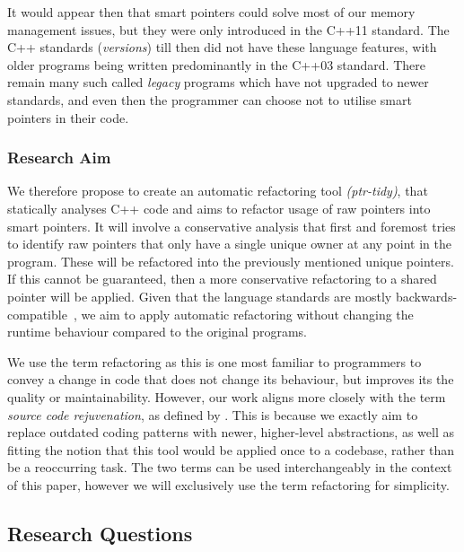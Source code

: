 \documentclass{proposal}
\begin{document}
    It would appear then that smart pointers could solve most of our memory management issues, but they were only introduced in the C++11 standard.
    The C++ standards (\textit{versions}) till then did not have these language features, with older programs being written predominantly in the C++03 standard.
    There remain many such called \emph{legacy} programs which have not upgraded to newer standards, and even then the programmer can choose not to utilise smart pointers in their code.

    \subsubsection{Research Aim}\label{subsubsec:reseach-aim}


    We therefore propose to create an automatic refactoring tool \emph{(ptr-tidy)}, that statically analyses C++ code and aims to refactor usage of raw pointers into smart pointers.
    It will involve a conservative analysis that first and foremost tries to identify raw pointers that only have a single unique owner at any point in the program.
    These will be refactored into the previously mentioned unique pointers.
    If this cannot be guaranteed, then a more conservative refactoring to a shared pointer will be applied.
    Given that the language standards are mostly backwards-compatible~\cite{Winters2020}, we aim to apply automatic refactoring without changing the runtime behaviour compared to the original programs.

    We use the term refactoring as this is one most familiar to programmers to convey a change in code that does not change its behaviour, but improves its the quality or maintainability.
    However, our work aligns more closely with the term \emph{source code rejuvenation}, as defined by \citet{Pirkelbauer2010}.
    This is because we exactly aim to replace outdated coding patterns with newer, higher-level abstractions, as well as fitting the notion that this tool would be applied once to a codebase, rather than be a reoccurring task.
    The two terms can be used interchangeably in the context of this paper, however we will exclusively use the term refactoring for simplicity.


    \subsection{Research Questions}\label{subsec:research-questions}
\end{document}
